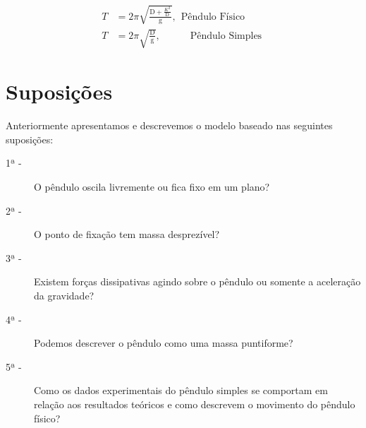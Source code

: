 \documentclass[a4paper]{report}
\begin{document}
\begin{align}
        T &= 2\pi \sqrt{\frac{\text{D} + \frac{\text{$K^2$}}{\text{D}}}{\text{g}}}, \ \ \text{Pêndulo Físico }\\
        T &= 2\pi \sqrt{\frac{\text{D}}{\text{g}}},\quad \qquad \text{Pêndulo Simples }
\end{align}

\section*{Suposições}
\qquad Anteriormente apresentamos e descrevemos o modelo baseado nas seguintes suposições: 
 \begin{description}
   \item[1ª -] O pêndulo oscila livremente ou fica fixo em um plano? 
   \item[2ª -] O ponto de fixação tem massa desprezível?
   \item[3ª -] Existem forças dissipativas agindo sobre o pêndulo ou somente a aceleração da gravidade?
   \item[4ª -] Podemos descrever o pêndulo como uma massa puntiforme?
   \item[5ª -] Como os dados experimentais do pêndulo simples se comportam em relação aos resultados teóricos e como descrevem o movimento do pêndulo físico?
 \end{description}
 
\end{document}
